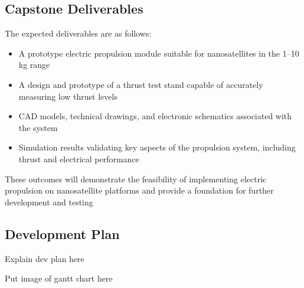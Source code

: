 \subsection{Capstone Deliverables}

The expected deliverables are as follows:

\begin{itemize}
    \item A prototype electric propulsion module suitable for nanosatellites in the 1–10 kg range
    \item A design and prototype of a thrust test stand capable of accurately measuring low thrust levels
    \item CAD models, technical drawings, and electronic schematics associated with the system
    \item Simulation results validating key aspects of the propulsion system, including thrust and electrical performance
\end{itemize}

These outcomes will demonstrate the feasibility of implementing electric propulsion on nanosatellite platforms and provide a foundation for further development and testing	

\subsection{Development Plan}

Explain dev plan here

Put image of gantt chart here